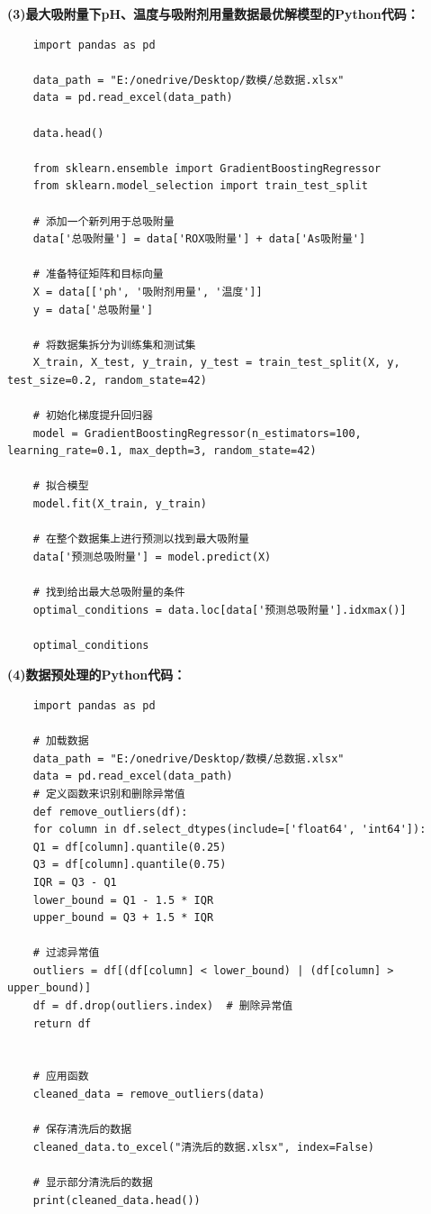\documentclass[AutoFakeBold]{ctexart}
\begin{document}
 
\centering\textbf{(3)最大吸附量下pH、温度与吸附剂用量数据最优解模型的Python代码：}

 \lstset{language=Python}
 \lstset{breaklines}%

 \begin{lstlisting}
 	import pandas as pd
 	
 	data_path = "E:/onedrive/Desktop/数模/总数据.xlsx"
 	data = pd.read_excel(data_path)
 	
 	data.head()
 	
 	from sklearn.ensemble import GradientBoostingRegressor
 	from sklearn.model_selection import train_test_split
 	
 	# 添加一个新列用于总吸附量
 	data['总吸附量'] = data['ROX吸附量'] + data['As吸附量']
 	
 	# 准备特征矩阵和目标向量
 	X = data[['ph', '吸附剂用量', '温度']]
 	y = data['总吸附量']
 	
 	# 将数据集拆分为训练集和测试集
 	X_train, X_test, y_train, y_test = train_test_split(X, y, test_size=0.2, random_state=42)
 	
 	# 初始化梯度提升回归器
 	model = GradientBoostingRegressor(n_estimators=100, learning_rate=0.1, max_depth=3, random_state=42)
 	
 	# 拟合模型
 	model.fit(X_train, y_train)
 	
 	# 在整个数据集上进行预测以找到最大吸附量
 	data['预测总吸附量'] = model.predict(X)
 	
 	# 找到给出最大总吸附量的条件
 	optimal_conditions = data.loc[data['预测总吸附量'].idxmax()]
 	
 	optimal_conditions
 \end{lstlisting} 
 
 \centering\textbf{(4)数据预处理的Python代码：}

 \lstset{language=Python}
 \lstset{breaklines}%
 
 \begin{lstlisting}
 	import pandas as pd
 	
 	# 加载数据
 	data_path = "E:/onedrive/Desktop/数模/总数据.xlsx"
 	data = pd.read_excel(data_path)
 	# 定义函数来识别和删除异常值
 	def remove_outliers(df):
 	for column in df.select_dtypes(include=['float64', 'int64']):
 	Q1 = df[column].quantile(0.25)
 	Q3 = df[column].quantile(0.75)
 	IQR = Q3 - Q1
 	lower_bound = Q1 - 1.5 * IQR
 	upper_bound = Q3 + 1.5 * IQR
 	
 	# 过滤异常值
 	outliers = df[(df[column] < lower_bound) | (df[column] > upper_bound)]
 	df = df.drop(outliers.index)  # 删除异常值
 	return df
 	
 	
 	# 应用函数
 	cleaned_data = remove_outliers(data)
 	
 	# 保存清洗后的数据
 	cleaned_data.to_excel("清洗后的数据.xlsx", index=False)
 	
 	# 显示部分清洗后的数据
 	print(cleaned_data.head())
 \end{lstlisting} 
 
\end{document}
